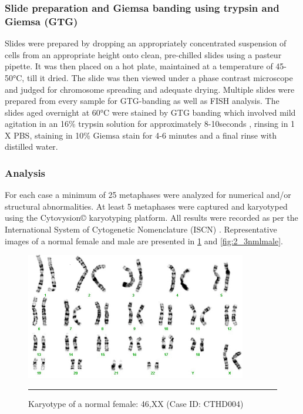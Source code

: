 \begin{refsection}
\subsubsection{Slide preparation and Giemsa banding using trypsin and Giemsa (GTG)}
Slides were prepared by dropping an appropriately concentrated suspension of cells from an appropriate height onto clean, pre-chilled slides using a pasteur pipette. It was then placed on a hot plate, maintained at a temperature of 45-50°C, till it dried. The slide was then viewed under a phase contrast microscope and judged for chromosome spreading and adequate drying. Multiple slides were prepared from every sample for GTG-banding as well as FISH analysis. The slides aged overnight at 60°C were stained by GTG banding which involved mild agitation in an 16\%  trypsin solution for  approximately 8-10seconds , rinsing in 1 X PBS, staining in 10\% Giemsa stain for 4-6 minutes and a final rinse with distilled water. 
\subsubsection{Analysis}
For each case a minimum of 25 metaphases were analyzed for numerical and/or structural abnormalities. At least 5 metaphases were captured and karyotyped using the Cytovysion© karyotyping platform. All results were recorded as per the International System of Cytogenetic Nomenclature (ISCN) \cite{shaffer2013iscn}. Representative images of a normal female and male are presented in \cref{fig:2_2nmlfemale} and \cref{fig:2_3nmlmale}.

\begin{figure}[!tb]
\centering
\includegraphics[width=\linewidth]{Figures/2_2nmlfemale.pdf} 
\rule{35em}{0.5pt}
\caption[Karyotype of a normal female]{Karyotype of a normal female: 46,XX (Case ID: CTHD004)}
\label{fig:2_2nmlfemale}
\end{figure}


\end{refsection}
